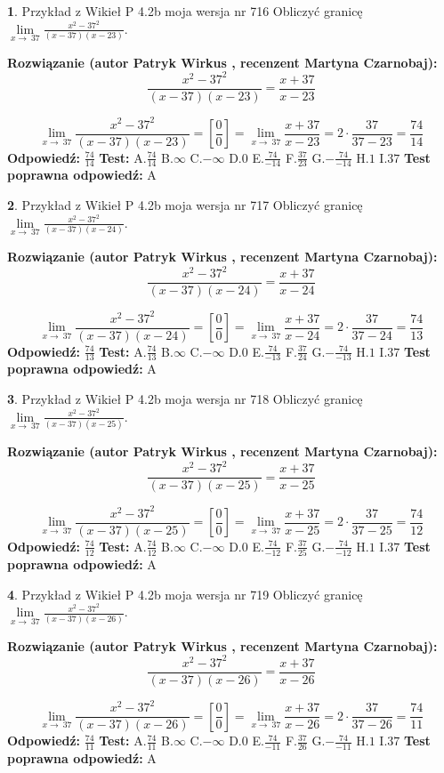 \documentclass[12pt, a4paper]{article}
\theoremstyle{definition} %
\newtheorem{zad}{}
\newcommand{\zadStart}[1]{\begin{zad}#1\newline}
\newcommand{\zadStop}{\end{zad}}
\newcommand{\rozwStart}[2]{\noindent \textbf{Rozwiązanie (autor #1 , recenzent #2): }\newline}
\newcommand{\rozwStop}{\newline}
\newcommand{\odpStart}{\noindent \textbf{Odpowiedź:}\newline}
\newcommand{\odpStop}{\newline}
\newcommand{\testStart}{\noindent \textbf{Test:}\newline}
\newcommand{\testStop}{\newline}
\newcommand{\kluczStart}{\noindent \textbf{Test poprawna odpowiedź:}\newline}
\newcommand{\kluczStop}{\newline}
\begin{document}
\zadStart{Przykład z Wikieł P 4.2b moja wersja nr 716}
Obliczyć granicę $\lim\limits_{x\to\ 37}\frac{x^{2}-37^{2}}{(x-37)(x-23)}$.
\zadStop
\rozwStart{Patryk Wirkus}{Martyna Czarnobaj}
$$\frac{x^{2}-37^{2}}{(x-37)(x-23)}=\frac{x+37}{x-23}$$

$$\lim\limits_{x\to\ 37}\frac{x^{2}-37^{2}}{(x-37)(x-23)}=[\frac{0}{0}]=\lim\limits_{x\to\ 37}\frac{x+37}{x-23}=2 \cdot \frac{37}{37-23} = \frac{74}{14}$$
\rozwStop
\odpStart
$\frac{74}{14}$
\odpStop
\testStart
A.$\frac{74}{14}$
B.$\infty$
C.$-\infty$
D.$0$
E.$\frac{74}{-14}$
F.$\frac{37}{23}$
G.$-\frac{74}{-14}$
H.$1$
I.$37$
\testStop
\kluczStart
A
\kluczStop



\zadStart{Przykład z Wikieł P 4.2b moja wersja nr 717}
Obliczyć granicę $\lim\limits_{x\to\ 37}\frac{x^{2}-37^{2}}{(x-37)(x-24)}$.
\zadStop
\rozwStart{Patryk Wirkus}{Martyna Czarnobaj}
$$\frac{x^{2}-37^{2}}{(x-37)(x-24)}=\frac{x+37}{x-24}$$

$$\lim\limits_{x\to\ 37}\frac{x^{2}-37^{2}}{(x-37)(x-24)}=[\frac{0}{0}]=\lim\limits_{x\to\ 37}\frac{x+37}{x-24}=2 \cdot \frac{37}{37-24} = \frac{74}{13}$$
\rozwStop
\odpStart
$\frac{74}{13}$
\odpStop
\testStart
A.$\frac{74}{13}$
B.$\infty$
C.$-\infty$
D.$0$
E.$\frac{74}{-13}$
F.$\frac{37}{24}$
G.$-\frac{74}{-13}$
H.$1$
I.$37$
\testStop
\kluczStart
A
\kluczStop



\zadStart{Przykład z Wikieł P 4.2b moja wersja nr 718}
Obliczyć granicę $\lim\limits_{x\to\ 37}\frac{x^{2}-37^{2}}{(x-37)(x-25)}$.
\zadStop
\rozwStart{Patryk Wirkus}{Martyna Czarnobaj}
$$\frac{x^{2}-37^{2}}{(x-37)(x-25)}=\frac{x+37}{x-25}$$

$$\lim\limits_{x\to\ 37}\frac{x^{2}-37^{2}}{(x-37)(x-25)}=[\frac{0}{0}]=\lim\limits_{x\to\ 37}\frac{x+37}{x-25}=2 \cdot \frac{37}{37-25} = \frac{74}{12}$$
\rozwStop
\odpStart
$\frac{74}{12}$
\odpStop
\testStart
A.$\frac{74}{12}$
B.$\infty$
C.$-\infty$
D.$0$
E.$\frac{74}{-12}$
F.$\frac{37}{25}$
G.$-\frac{74}{-12}$
H.$1$
I.$37$
\testStop
\kluczStart
A
\kluczStop



\zadStart{Przykład z Wikieł P 4.2b moja wersja nr 719}
Obliczyć granicę $\lim\limits_{x\to\ 37}\frac{x^{2}-37^{2}}{(x-37)(x-26)}$.
\zadStop
\rozwStart{Patryk Wirkus}{Martyna Czarnobaj}
$$\frac{x^{2}-37^{2}}{(x-37)(x-26)}=\frac{x+37}{x-26}$$

$$\lim\limits_{x\to\ 37}\frac{x^{2}-37^{2}}{(x-37)(x-26)}=[\frac{0}{0}]=\lim\limits_{x\to\ 37}\frac{x+37}{x-26}=2 \cdot \frac{37}{37-26} = \frac{74}{11}$$
\rozwStop
\odpStart
$\frac{74}{11}$
\odpStop
\testStart
A.$\frac{74}{11}$
B.$\infty$
C.$-\infty$
D.$0$
E.$\frac{74}{-11}$
F.$\frac{37}{26}$
G.$-\frac{74}{-11}$
H.$1$
I.$37$
\testStop
\kluczStart
A
\kluczStop
\end{document}
